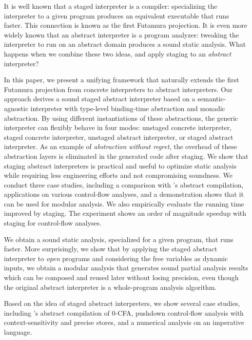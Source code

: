 It is well known that a staged interpreter is a compiler: specializing the
interpreter to a given program produces an equivalent executable that runs faster.
This connection is known as the first Futamura projection.
It is even more widely known that an abstract interpreter is a program analyzer:
tweaking the interpreter to run on an abstract domain produces a sound static
analysis. What happens when we combine these two ideas, and apply staging to
an \emph{abstract} interpreter?

In this paper, we present a unifying framework that naturally extends the first
Futamura projection from concrete interpreters to abstract interpreters. Our
approach derives a sound staged abstract interpreter based on a
semantic-agnostic interpreter with type-level binding-time abstraction and
monadic abstraction. By using different instantiations of these abstractions,
the generic interpreter can flexibly behave in four modes: unstaged concrete
interpreter, staged concrete interpreter, unstaged abstract interpreter, or
staged abstract interpreter.
As an example of \emph{abstraction without regret}, the overhead of these
abstraction layers is eliminated in the generated code after staging.
We show that staging abstract interpreters is practical and useful to
optimize static analysis while requiring less engineering efforts and not
compromising soundness. We conduct three case studies, including a comparison
with \citeauthor{Boucher:1996:ACN:647473.727587}'s abstract compilation,
applications on various control-flow analyses, and a demonstration shows that
it can be used for modular analysis.
We also empirically evaluate the running time improved by staging.
The experiment shows an order of magnitude speedup with staging for
control-flow analyses.

\iffalse
We obtain a sound static analysis, specialized for
a given program, that runs faster. More surprisingly, we show that by applying
the staged abstract interpreter to \textit{open} programs and considering the
free variables as dynamic inputs, we obtain a modular analysis that generates
sound partial analysis results which can be composed and reused later without
losing precision, even though the original abstract interpreter is a
whole-program analysis algorithm.

Based on the idea of staged abstract interpreters, we show several case studies,
including \citeauthor{Boucher:1996:ACN:647473.727587}'s abstract compilation of
0-CFA, pushdown control-flow analysis with context-sensitivity and precise
stores, and a numerical analysis on an imperative language.

